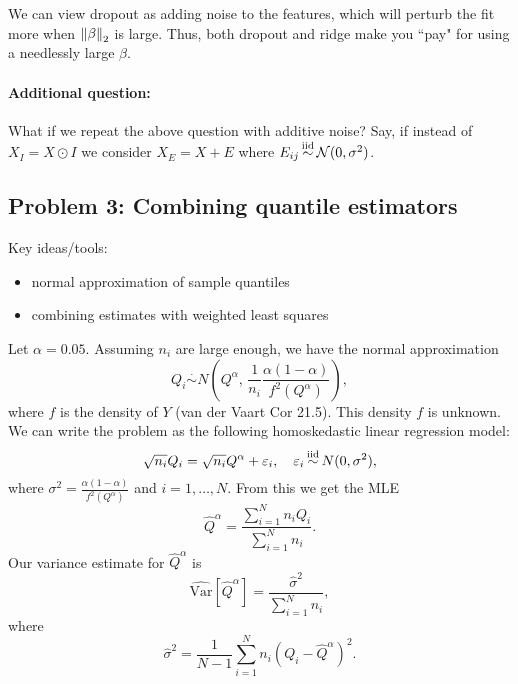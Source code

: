 We can view dropout as adding noise to the features, which will perturb the fit more when $\left \lVert \beta \right \rVert_2$ is large. Thus, both dropout and ridge make you ``pay" for using a needlessly large $\beta$.

\paragraph{Additional question:} What if we repeat the above question with additive noise? Say, if instead of $X_I = X \odot I$ we consider $X_E = X + E$ where $E_{ij} \simiid \nn(0, \sigma^2)$.

\subsection*{Problem 3: Combining quantile estimators}
Key ideas/tools:
\begin{itemize}
\item normal approximation of sample quantiles
\item combining estimates with weighted least squares
\end{itemize}

Let $\alpha = 0.05$. Assuming $n_i$ are large enough, we have the normal approximation	
	\begin{equation*}
	Q_i \overset{\cdot}{\sim} N\left(Q^{\alpha}, \, \frac{1}{n_i} \frac{\alpha (1 - \alpha)}{f^2\left({Q^\alpha}\right)}\right),
	\end{equation*}
	where $f$ is the density of $Y$ (van der Vaart Cor 21.5). This density $f$ is unknown. We can write the problem as the following homoskedastic linear regression model:
	\begin{equation*}
	\sqrt{n_i} Q_i = \sqrt{n_i}Q^\alpha + \eps_i, \quad \eps_i \simiid N(0, \sigma^2),
	\end{equation*}
	where $\sigma^2 = \frac{\alpha(1-\alpha)}{f^2(Q^\alpha)}$ and $i=1,\ldots,N$. From this we get the MLE
	\begin{equation*}
	\hat Q^\alpha = \frac{\sum_{i=1}^N n_i Q_i}{\sum_{i=1}^N n_i}.
	\end{equation*}
	Our variance estimate for $\hat Q^\alpha$ is
	\begin{equation*}
	\widehat{\text{Var}}[\hat Q^\alpha] = \frac{\hat \sigma^2}{\sum_{i=1}^N n_i},
	\end{equation*}
	where
	\begin{equation*}
	\hat \sigma^2 = \frac{1}{N-1}\sum_{i = 1}^N n_i(Q_i - \hat Q^\alpha)^2.
	\end{equation*}


